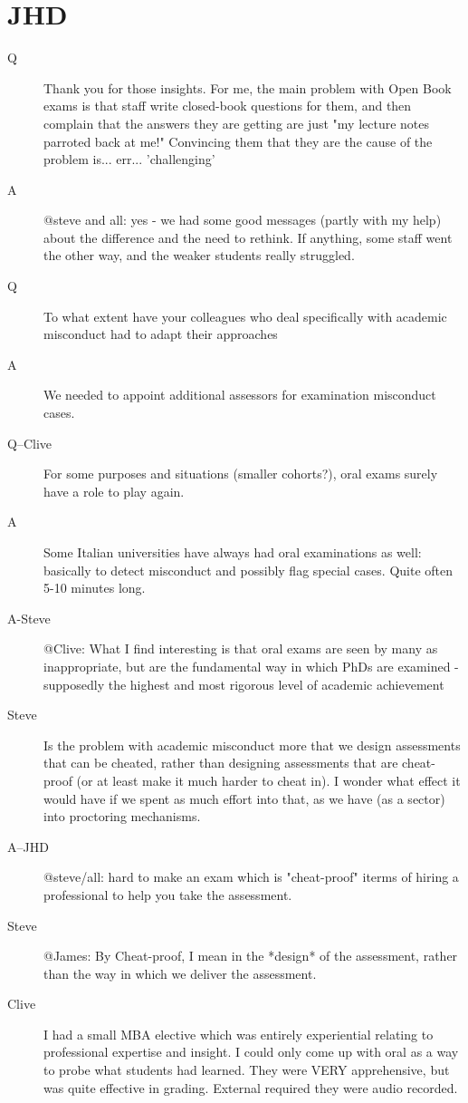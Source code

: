 \documentclass{article}
\begin{document}
\section{JHD}
\begin{description}
\item[Q]Thank you for those insights. For me, the main problem with Open Book exams is that staff write closed-book questions for them, and then complain that the answers they are getting are just "my lecture notes parroted back at me!"  Convincing them that they are the cause of the problem is... err... 'challenging'
\item[A]@steve and all: yes - we had some good messages (partly with my help) about the difference and the need to rethink.  If anything, some staff went the other way, and the weaker students really struggled.
\item[Q]To what extent have your colleagues who deal specifically with academic misconduct had to adapt their approaches
\item[A]We needed to appoint additional assessors for examination misconduct  cases.
\item[Q--Clive]For some purposes and situations (smaller cohorts?), oral exams surely have a role to play again.
\item[A]Some Italian universities have always had oral examinations as well: basically to detect misconduct and possibly flag special cases.  Quite often 5-10 minutes long.
\item[A-Steve]@Clive:  What I find interesting is that oral exams are seen by many as inappropriate, but are the fundamental way in which PhDs are examined - supposedly the highest and most rigorous level of academic achievement
\item[Steve]Is the problem with academic misconduct more that we design assessments that can be cheated, rather than designing assessments that are cheat-proof (or at least make it much harder to cheat in). I wonder what effect it would have if we spent as much effort into that, as we have (as a sector) into proctoring mechanisms.
\item[A--JHD]@steve/all: hard to make an exam which is "cheat-proof" iterms of hiring a professional to help you take the assessment.
\item[Steve]@James: By Cheat-proof, I mean in the *design* of the assessment, rather than the way in which we deliver the assessment.
\item[Clive]I had a small  MBA elective which was entirely experiential relating to professional expertise and insight. I could only come up with oral as a way to probe what students had learned. They were VERY apprehensive, but was quite effective in grading. External required they were audio recorded.
\end{description}
\end{document}
